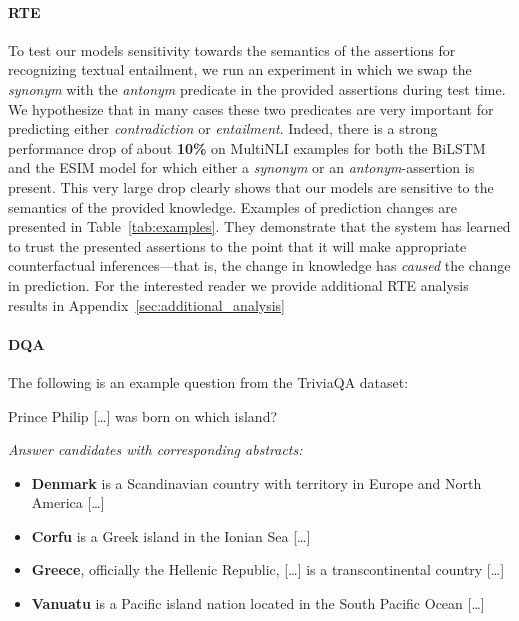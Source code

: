 \documentclass[11pt,a4paper]{article}
\begin{document}
\paragraph{RTE} To test our models sensitivity towards the semantics of the assertions for recognizing textual entailment, we run an experiment in which we swap the \textit{synonym} with the \textit{antonym} predicate in the provided assertions during test time. We hypothesize that in many cases these two predicates are very important for predicting either \textit{contradiction} or \textit{entailment}. Indeed, there is a strong performance drop of about \textbf{10\%} on MultiNLI examples for both the BiLSTM and the ESIM model for which either a \textit{synonym} or an \textit{antonym}-assertion is present. This very large drop clearly shows that our models are sensitive to the semantics of the provided knowledge. Examples of prediction changes are presented in Table~\ref{tab:examples}. They demonstrate that the system has learned to trust the presented assertions to the point that it will make appropriate counterfactual inferences---that is, the change in knowledge has \emph{caused} the change in prediction. For the interested reader we provide additional RTE analysis results in Appendix~\ref{sec:additional_analysis}

\paragraph{DQA} The following is an example question from the TriviaQA dataset:

\begin{mdframed}[roundcorner=2pt]
\small
Prince Philip [\ldots] was born on which island?

\noindent \textit{Answer candidates with corresponding abstracts:}
\begin{itemize}[noitemsep,nolistsep]
\item \textbf{Denmark} is a Scandinavian country with territory in Europe and North America [\ldots]
\item \textbf{Corfu} is a Greek island in the Ionian Sea [\ldots]
\item \textbf{Greece}, officially the Hellenic Republic, [\ldots] is a transcontinental country [\ldots]
\item \textbf{Vanuatu} is a Pacific island nation located in the South Pacific Ocean [\ldots]
\end{itemize}

\end{mdframed}
\end{document}
